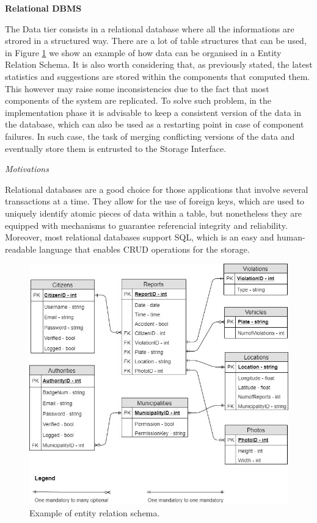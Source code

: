 \documentclass{report}
\begin{document}
\vspace{2mm}
\begin{center}\large{\textbf{Relational DBMS}}\end{center}
The Data tier consists in a relational database where all the informations are strored in a structured way. There are a lot of table structures that can be used, 
in Figure \ref{fig:RDBMS} we show an example of how data can be organised in a Entity Relation Schema. It is also worth considering that, as previously stated, the latest statistics and suggestions are stored within the components that computed them. This however may raise some inconsistencies due to the fact that most components of the system are replicated. To solve such problem, in the implementation phase it is advisable to keep a consistent version of the data in the database, which can also be used as a restarting point in case of component failures. In such case, the task of merging conflicting versions of the data and eventually store them is entrusted to the Storage Interface.
\begin{center}\large{\textit{Motivations}}\end{center}
Relational databases are a good choice for those applications that involve several transactions at a time. They allow for the use of foreign keys, which are used to uniquely identify atomic pieces of data within a table, but nonetheless they are equipped with mechanisms to guarantee referencial integrity and reliability. Moreover, most relational databases support SQL, which is an easy and human-readable language that enables CRUD operations for the storage.
\begin{figure}[H]
	\begin{center}
	\includegraphics[width=\textwidth]{img/RDBMS.png}
    \end{center}
    \label{fig:RDBMS}
    \caption{Example of entity relation schema.}
\end{figure}
\end{document}
